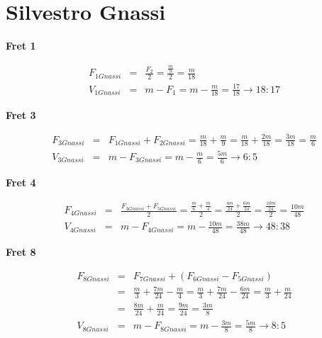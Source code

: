 \section{Silvestro Gnassi}

\textbf{Fret 1}

\begin{eqnarray*}
    F_{1Gnassi}
        &=& \frac{F_2}{2}
        = \frac{\frac{m}{9}}{2}
        = \frac{m}{18} \\
    V_{1Gnassi}
        &=& m - F_1
        = m - \frac{m}{18}
        = \frac{17}{18}
        \to 18:17
\end{eqnarray*}

\textbf{Fret 3}

\begin{eqnarray*}
    F_{3Gnassi}
        &=& F_{1Gnassi} + F_{2Gnassi}
        = \frac{m}{18} + \frac{m}{9}
        = \frac{m}{18} + \frac{2m}{18}
        = \frac{3m}{18}
        = \frac{m}{6} \\
    V_{3Gnassi}
        &=& m - F_{3Gnassi}
        = m - \frac{m}{6}
        = \frac{5m}{6}
        \to 6:5
\end{eqnarray*}

\textbf{Fret 4}

\begin{eqnarray*}
    F_{4Gnassi}
        &=& \frac{F_{3Gnassi} + F_{5Gnassi}}{2}
        = \frac{\frac{m}{6} + \frac{m}{4}}{2}
        = \frac{\frac{4m}{24} + \frac{6m}{24}}{2}
        = \frac{\frac{10m}{24}}{2}
        = \frac{10m}{48} \\
    V_{4Gnassi}
        &=& m - F_{4Gnassi}
        = m - \frac{10m}{48}
        = \frac{38m}{48}
        \to 48:38
\end{eqnarray*}

\textbf{Fret 8}

\begin{eqnarray*}
    F_{8Gnassi}
        &=& F_{7Gnassi} + (F_{6Gnassi} - F_{5Gnassi}) \\
        &=& \frac{m}{3} + \frac{7m}{24} - \frac{m}{4}
        = \frac{m}{3} + \frac{7m}{24} - \frac{6m}{24}
        = \frac{m}{3} + \frac{m}{24} \\
        &=& \frac{8m}{24} + \frac{m}{24}
        = \frac{9m}{24}
        = \frac{3m}{8} \\
    V_{8Gnassi}
        &=& m - F_{8Gnassi}
        = m - \frac{3m}{8}
        = \frac{5m}{8}
        \to 8:5
\end{eqnarray*}
